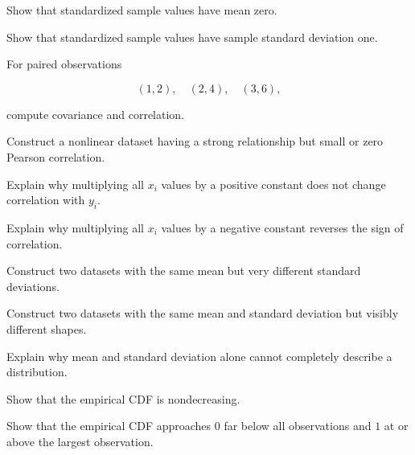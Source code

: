 \begin{exercise}[3]
Show that standardized sample values have mean zero.
\end{exercise}

\begin{exercise}[3]
Show that standardized sample values have sample standard deviation one.
\end{exercise}

\begin{exercise}[3]
For paired observations

\[
(1,2),
\quad
(2,4),
\quad
(3,6),
\]

compute covariance and correlation.
\end{exercise}

\begin{exercise}[3]
Construct a nonlinear dataset having a strong relationship but small or
zero Pearson correlation.
\end{exercise}

\begin{exercise}[3]
Explain why multiplying all \(x_i\) values by a positive constant does
not change correlation with \(y_i\).
\end{exercise}

\begin{exercise}[3]
Explain why multiplying all \(x_i\) values by a negative constant
reverses the sign of correlation.
\end{exercise}

\begin{exercise}[3]
Construct two datasets with the same mean but very different standard
deviations.
\end{exercise}

\begin{exercise}[3]
Construct two datasets with the same mean and standard deviation but
visibly different shapes.
\end{exercise}

\begin{exercise}[3]
Explain why mean and standard deviation alone cannot completely describe
a distribution.
\end{exercise}

\begin{exercise}[3]
Show that the empirical CDF is nondecreasing.
\end{exercise}

\begin{exercise}[3]
Show that the empirical CDF approaches \(0\) far below all observations
and \(1\) at or above the largest observation.
\end{exercise}

